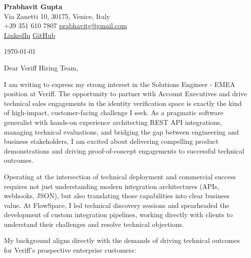 \documentclass[11pt,a4paper]{article}
\begin{document}
\begin{center}
    {\huge \textbf{Prabhavit Gupta}} \\
    \vspace{4pt}
    Via Zanetti 10, 30175, Venice, Italy \\
    +39 351 610 7807 \textbar{} \href{mailto:prabhavitg@gmail.com}{prabhavitg@gmail.com} \\
    \href{https://www.linkedin.com/in/prabhavit/}{LinkedIn} \textbar{} \href{https://github.com/prab-gupta}{GitHub}
\end{center}

\vspace{20pt}

\noindent \today

\vspace{10pt}

\noindent Dear Veriff Hiring Team,

\vspace{10pt}

\noindent I am writing to express my strong interest in the Solutions Engineer - EMEA position at Veriff. The opportunity to partner with Account Executives and drive technical sales engagements in the identity verification space is exactly the kind of high-impact, customer-facing challenge I seek. As a pragmatic software generalist with hands-on experience architecting REST API integrations, managing technical evaluations, and bridging the gap between engineering and business stakeholders, I am excited about delivering compelling product demonstrations and driving proof-of-concept engagements to successful technical outcomes.

\noindent Operating at the intersection of technical deployment and commercial success requires not just understanding modern integration architectures (APIs, webhooks, JSON), but also translating those capabilities into clear business value. At FlowSpace, I led technical discovery sessions and spearheaded the development of custom integration pipelines, working directly with clients to understand their challenges and resolve technical objections.

\noindent My background aligns directly with the demands of driving technical outcomes for Veriff's prospective enterprise customers:
\end{document}
